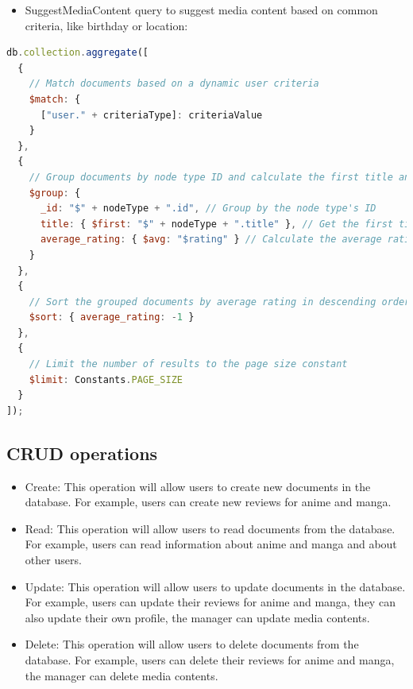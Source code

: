 \begin{itemize}
  \item SuggestMediaContent query to suggest media content based on common criteria, like birthday or location:
  
\end{itemize}

\begin{lstlisting}[language=JavaScript, caption=SuggestMediaContent]
  db.collection.aggregate([
  {
    // Match documents based on a dynamic user criteria
    $match: {
      ["user." + criteriaType]: criteriaValue
    }
  },
  {
    // Group documents by node type ID and calculate the first title and average rating
    $group: {
      _id: "$" + nodeType + ".id", // Group by the node type's ID
      title: { $first: "$" + nodeType + ".title" }, // Get the first title in the group
      average_rating: { $avg: "$rating" } // Calculate the average rating for the group
    }
  },
  {
    // Sort the grouped documents by average rating in descending order
    $sort: { average_rating: -1 }
  },
  {
    // Limit the number of results to the page size constant
    $limit: Constants.PAGE_SIZE
  }
]);
\end{lstlisting}







\subsection {CRUD operations}
\begin{itemize}
    \item Create: This operation will allow users to create new documents in the database. For example, users can create new reviews for anime and manga.
    \item Read: This operation will allow users to read documents from the database. For example, users can read information about anime and manga and about other users.
    \item Update: This operation will allow users to update documents in the database. For example, users can update their reviews for anime and manga, they can also update their own profile, the manager can update media contents.
    \item Delete: This operation will allow users to delete documents from the database. For example, users can delete their reviews for anime and manga, the manager can delete media contents.
\end{itemize}


